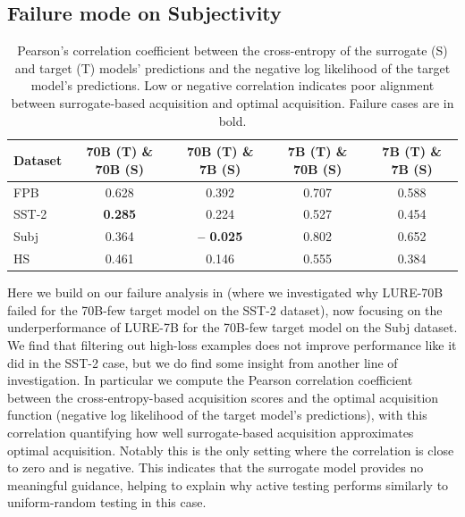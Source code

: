 \subsection{Failure mode on Subjectivity}


\begin{table}[t]
    \centering
    \small
    \begin{tabular}{l c c c c}
        \toprule
        Dataset & 70B (T) \& 70B (S) & 70B (T) \& 7B (S) & 7B (T) \& 70B (S) & 7B (T) \& 7B (S) \\
        \midrule
        FPB & 0.628 & 0.392 & 0.707 & 0.588\\
        SST-2 & \textbf{0.285} & 0.224 & 0.527 & 0.454\\
        Subj & 0.364 & \textbf{-- 0.025}& 0.802 & 0.652\\
        HS & 0.461 & 0.146 & 0.555 & 0.384\\
        \bottomrule
    \end{tabular}
    \vspace{1em}
    \caption{
        Pearson's correlation coefficient between the cross-entropy of the surrogate (S) and target (T) models' predictions and the negative log likelihood of the target model's predictions.
        Low or negative correlation indicates poor alignment between surrogate-based acquisition and optimal acquisition.
        Failure cases are in bold.
    }
    \label{tab:pearson_fewshot}
\end{table}


Here we build on our failure analysis in  (where we investigated why LURE-70B failed for the 70B-few target model on the SST-2 dataset), now focusing on the underperformance of LURE-7B for the 70B-few target model on the Subj dataset.
We find that filtering out high-loss examples does not improve performance like it did in the SST-2 case, but we do find some insight from another line of investigation.
In particular we compute the Pearson correlation coefficient between the cross-entropy-based acquisition scores and the optimal acquisition function (negative log likelihood of the target model's predictions), with this correlation quantifying how well surrogate-based acquisition approximates optimal acquisition.
Notably this is the only setting where the correlation is close to zero and is negative.
This indicates that the surrogate model provides no meaningful guidance, helping to explain why active testing performs similarly to uniform-random testing in this case.


